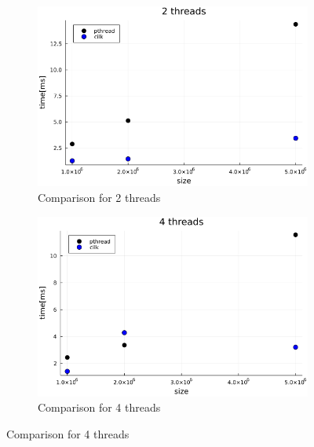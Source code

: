 \documentclass[11pt,a4paper,onecolumn,final]{article}
\begin{document}
\begin{figure}
    \begin{subfigure}{.5\textwidth}
        \centering
        \includegraphics[width=.9\linewidth]{../data/image/thread/2-threads.png}
        \caption{Comparison for 2 threads}
    \end{subfigure}%
    \begin{subfigure}{.5\textwidth}
        \centering
        \includegraphics[width=.9\linewidth]{../data/image/thread/4-threads.png}
        \caption{Comparison for 4 threads}
    \end{subfigure}
\end{figure}
\end{document}
